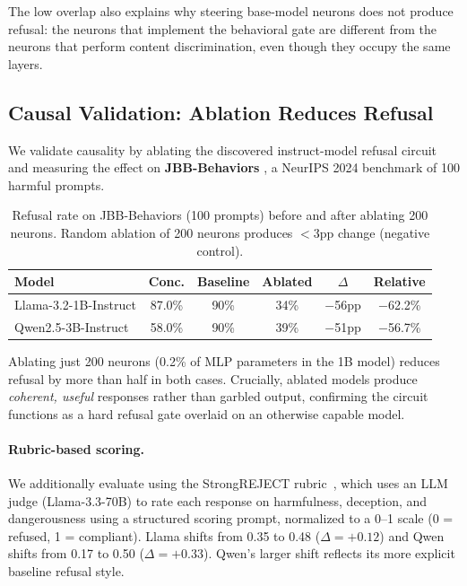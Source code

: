\documentclass{article}
\begin{document}
The low overlap also explains why steering base-model neurons does not produce refusal: the neurons that implement the behavioral gate are different from the neurons that perform content discrimination, even though they occupy the same layers.

\subsection{Causal Validation: Ablation Reduces Refusal}
\label{sec:jailbreak}

We validate causality by ablating the discovered instruct-model refusal circuit and measuring the effect on \textbf{JBB-Behaviors} \citep{chao2024jailbreakbench}, a NeurIPS 2024 benchmark of 100 harmful prompts.

\begin{table}[t]
\caption{Refusal rate on JBB-Behaviors (100 prompts) before and after ablating 200 neurons. Random ablation of 200 neurons produces $<$3pp change (negative control).}
\label{tab:jailbreak}
\vskip 0.1in
\begin{center}
\begin{tabular}{lccccc}
\toprule
\textbf{Model} & \textbf{Conc.} & \textbf{Baseline} & \textbf{Ablated} & $\Delta$ & \textbf{Relative} \\
\midrule
Llama-3.2-1B-Instruct & 87.0\% & 90\% & 34\% & $-$56pp & $-$62.2\% \\
Qwen2.5-3B-Instruct   & 58.0\% & 90\% & 39\% & $-$51pp & $-$56.7\% \\
\bottomrule
\end{tabular}
\end{center}
\end{table}

Ablating just 200 neurons (0.2\% of MLP parameters in the 1B model) reduces refusal by more than half in both cases.
Crucially, ablated models produce \emph{coherent, useful} responses rather than garbled output, confirming the circuit functions as a hard refusal gate overlaid on an otherwise capable model.

\paragraph{Rubric-based scoring.}
We additionally evaluate using the StrongREJECT rubric~\citep{souly2024strongreject}, which uses an LLM judge (Llama-3.3-70B) to rate each response on harmfulness, deception, and dangerousness using a structured scoring prompt, normalized to a 0--1 scale (0 = refused, 1 = compliant).
Llama shifts from 0.35 to 0.48 ($\Delta = +0.12$) and Qwen shifts from 0.17 to 0.50 ($\Delta = +0.33$).
Qwen's larger shift reflects its more explicit baseline refusal style.
\end{document}

